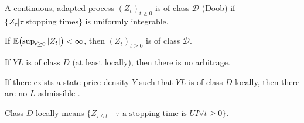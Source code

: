 \begin{defn}
  \label{defn:continuous_time:24}
  A continuous, adapted process $(Z_{t})_{t \geq 0}$ is of class
  $\mathcal{D}$ (Doob) if $\{ Z_{\tau} | \text{$\tau$ stopping times}
  \}$ is uniformly integrable.
\end{defn}

\begin{remark}
  If $\E{\sup_{t \geq 0} |Z_{t}|} < \infty$, then $(Z_{t})_{t \geq 0}$
  is of class $\mathcal{D}$.
\end{remark}

\begin{thm}
  \label{defn:continuous_time:25}
  If $YL$ is of class $D$ (at least locally), then there is no arbitrage.
\end{thm}

\begin{thm}
  \label{defn:continuous_time:26}
  If there exists a state price density $Y$ such that $YL$ is of class
  $D$ locally, then there are no $L$-admissible .

  Class $D$ locally means $\{ \text{$Z_{\tau \wedge t}$ - $\tau$ a
    stopping time is $UI \forall t \geq 0$} \}$.
\end{thm}

